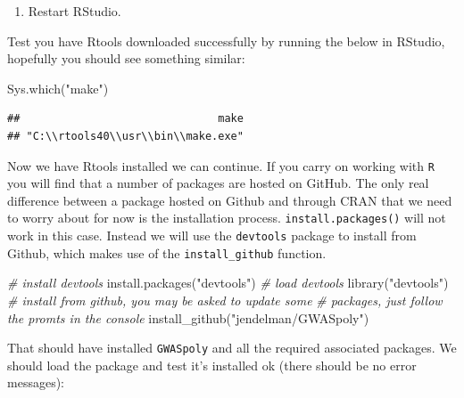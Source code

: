 \documentclass[
]{book}
\newenvironment{Shaded}{\begin{snugshade}}{\end{snugshade}}
\newcommand{\CommentTok}[1]{\textcolor[rgb]{0.56,0.35,0.01}{\textit{#1}}}
\newcommand{\FunctionTok}[1]{\textcolor[rgb]{0.00,0.00,0.00}{#1}}
\newcommand{\NormalTok}[1]{#1}
\newcommand{\StringTok}[1]{\textcolor[rgb]{0.31,0.60,0.02}{#1}}
\providecommand{\tightlist}{%
  \setlength{\itemsep}{0pt}\setlength{\parskip}{0pt}}
\begin{document}
\begin{enumerate}
\def\labelenumi{\arabic{enumi}.}
\setcounter{enumi}{3}
\tightlist
\item
  Restart RStudio.
\end{enumerate}

Test you have Rtools downloaded successfully by running the below in RStudio, hopefully you should see something similar:

\begin{Shaded}
\begin{Highlighting}[]
\FunctionTok{Sys.which}\NormalTok{(}\StringTok{"make"}\NormalTok{)}
\end{Highlighting}
\end{Shaded}

\begin{verbatim}
##                               make 
## "C:\\rtools40\\usr\\bin\\make.exe"
\end{verbatim}

Now we have Rtools installed we can continue. If you carry on working with \texttt{R} you will find that a number of packages are hosted on GitHub. The only real difference between a package hosted on Github and through CRAN that we need to worry about for now is the installation process. \texttt{install.packages()} will not work in this case. Instead we will use the \texttt{devtools} package to install from Github, which makes use of the \texttt{install\_github} function.

\begin{Shaded}
\begin{Highlighting}[]
\CommentTok{\# install devtools}
\FunctionTok{install.packages}\NormalTok{(}\StringTok{"devtools"}\NormalTok{)}
\CommentTok{\# load devtools}
\FunctionTok{library}\NormalTok{(}\StringTok{"devtools"}\NormalTok{)}
\CommentTok{\# install from github, you may be asked to update some}
\CommentTok{\# packages, just follow the promts in the console}
\FunctionTok{install\_github}\NormalTok{(}\StringTok{"jendelman/GWASpoly"}\NormalTok{)}
\end{Highlighting}
\end{Shaded}

That should have installed \texttt{GWASpoly} and all the required associated packages. We should load the package and test it's installed ok (there should be no error messages):
\end{document}
